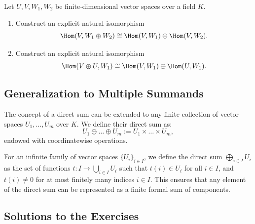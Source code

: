 \begin{exercise}
\label{exc:hom_direct_sum_decompositions}
Let $U, V, W_1, W_2$ be finite-di\-men\-sional vector spaces over a field $K$.
\begin{enumerate}
    \item Construct an explicit natural isomorphism
    \[
    \Hom(V, W_1 \oplus W_2) \cong \Hom(V, W_1) \oplus \Hom(V, W_2).
    \]
    \item Construct an explicit natural isomorphism
    \[
    \Hom(V \oplus U, W_1) \cong \Hom(V, W_1) \oplus \Hom(U, W_1).
    \]
\end{enumerate}
\end{exercise}

\subsection{Generalization to Multiple Summands}

The concept of a direct sum can be extended to any finite collection of vector spaces $U_1, \dots, U_m$ over $K$. We define their direct sum as:
\[
U_1 \oplus \dots \oplus U_m := U_1 \times \dots \times U_m,
\]
endowed with coordinatewise operations.

For an infinite family of vector spaces $\{U_i\}_{i \in I}$, we define the direct sum $\bigoplus_{i \in I} U_i$ as the set of functions $t \colon I \to \bigcup_{i \in I} U_i$ such that $t(i) \in U_i$ for all $i \in I$, and $t(i) \neq 0$ for at most finitely many indices $i \in I$. This ensures that any element of the direct sum can be represented as a finite formal sum of components.

\subsection{Solutions to the Exercises}
\label{sec:solutions_direct_sums}

